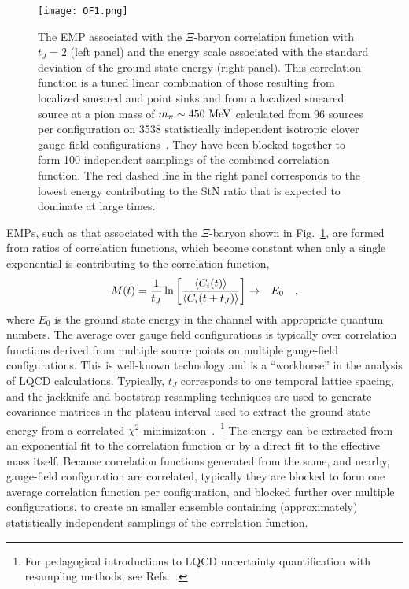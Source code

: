 %
\begin{figure}[!ht]
	\texttt{[image: OF1.png]}
	\caption{
	\label{fig:xiemp} 
	The EMP associated with the $\Xi$-baryon correlation function with $t_J =2$ (left panel)
	and the energy scale associated with the standard deviation of the ground state energy (right panel).
	This correlation function  is a tuned linear combination 
	of those resulting from localized smeared and 
	point sinks and from a localized smeared source at a pion mass of $m_\pi\sim 450~{\rm MeV}$
	calculated  from 96 sources per configuration on 3538 statistically independent isotropic clover gauge-field 
	configurations~\protect\cite{Orginos:2015aya}.	  
	They have been blocked together to form 100 independent samplings of the combined correlation function.
	The red dashed line in the right panel corresponds to the lowest energy contributing to the StN ratio that is expected to dominate at large times.
	}		
\end{figure}
%
EMPs, such as that associated with the $\Xi$-baryon shown in Fig.~\ref{fig:xiemp},
 are formed from ratios of correlation functions, which become constant when only 
a single exponential is contributing to the correlation function,
%
\begin{eqnarray}
  M(t) = \frac{1}{t_J}\ln\left[ {\langle C_i(t) \rangle \over \langle C_i(t+ t_J) \rangle}  \right] & \rightarrow & E_0
\label{eq:emdef}
\ \ \ ,
\end{eqnarray}
%
where $E_0$ is the ground state energy in the channel with appropriate quantum numbers.
The average over gauge field configurations is typically  over  correlation functions derived from multiple source points on multiple gauge-field configurations.
This is well-known technology and is a ``workhorse'' in the analysis of LQCD calculations.
Typically, $t_J$ corresponds to one temporal lattice spacing, and the jackknife and bootstrap resampling techniques are used to generate covariance matrices in the plateau interval used to extract the 
ground-state energy from a correlated $\chi^2$-minimization~\cite{DeGrand:1990ss,Beane:2010em,Beane:2014oea}.~\footnote{
For pedagogical introductions to LQCD uncertainty quantification with resampling methods, 
see Refs.~\cite{Young,DeGrand:1990,Luscher:2010ae,Beane:2014oea}.
}
The energy can be extracted from an exponential fit to the correlation function or by a direct fit to the effective mass itself.
Because correlation functions generated from the same, and nearby, gauge-field configuration are correlated,
typically they are blocked to form one average correlation function 
per configuration, and  blocked further over multiple configurations, to create an smaller ensemble 
containing (approximately) statistically independent samplings of the correlation function.    


